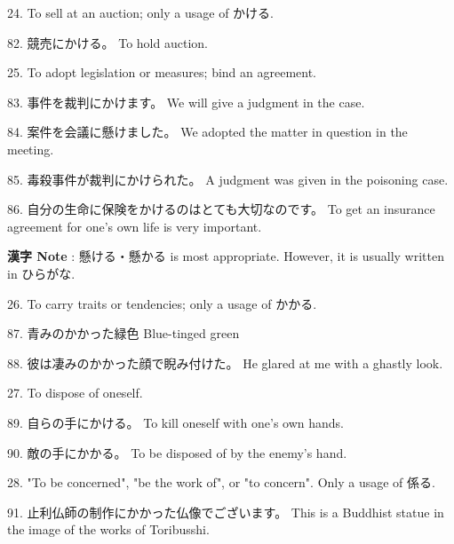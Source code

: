 \par{24. To sell at an auction; only a usage of かける. }

\par{82. 競売にかける。 \hfill\break
To hold auction. }

\par{25. To adopt legislation or measures; bind an agreement. }

\par{83. 事件を裁判にかけます。 \hfill\break
We will give a judgment in the case. }

\par{84. 案件を会議に懸けました。 \hfill\break
We adopted the matter in question in the meeting. }

\par{85. 毒殺事件が裁判にかけられた。 \hfill\break
A judgment was given in the poisoning case. }

\par{86. 自分の生命に保険をかけるのはとても大切なのです。 \hfill\break
To get an insurance agreement for one's own life is very important. }

\par{\textbf{漢字 Note }: 懸ける・懸かる is most appropriate. However, it is usually written in ひらがな. }

\par{26. To carry traits or tendencies; only a usage of かかる. }

\par{87. 青みのかかった緑色 \hfill\break
Blue-tinged green }

\par{88. 彼は凄みのかかった顔で睨み付けた。 \hfill\break
He glared at me with a ghastly look. }

\par{27. To dispose of oneself. }

\par{89. 自らの手にかける。 \hfill\break
To kill oneself with one's own hands. }

\par{90. 敵の手にかかる。 \hfill\break
To be disposed of by the enemy's hand. }

\par{28. "To be concerned", "be the work of", or "to concern". Only a usage of 係る. }

\par{91. 止利仏師の制作にかかった仏像でございます。 \hfill\break
This is a Buddhist statue in the image of the works of Toribusshi. }

